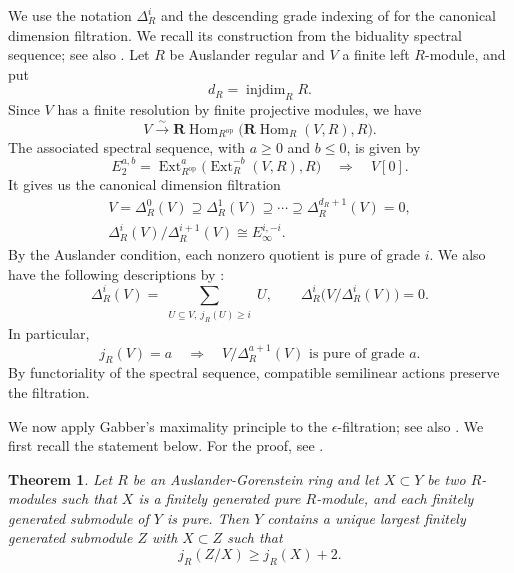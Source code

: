 \documentclass[11pt]{article}
\newtheorem{theorem}{Theorem}[section]
\theoremstyle{definition}
\begin{document}
We use the notation $\Delta_R^i$ and the descending grade indexing
of \cite[\S8]{ST03} for the canonical dimension filtration.
We recall its construction from the biduality spectral sequence;
see also \cite[\S3.1]{Venjakob2002}.
Let $R$ be Auslander regular and $V$ a finite left $R$-module, and put
\[
 d_R=\operatorname{injdim}_R R.
\]
Since $V$ has a finite resolution by finite projective modules, we have
\[
 V\xrightarrow{\sim}
 \mathbf R\!\operatorname{Hom}_{R^{\mathrm{op}}}
 \bigl(\mathbf R\!\operatorname{Hom}_R(V,R),R\bigr).
\]
The associated spectral sequence, with $a\geq0$ and $b\leq0$, is given by
\[
 E_2^{a,b}=
 \operatorname{Ext}_{R^{\mathrm{op}}}^{a}
 \bigl(\operatorname{Ext}_R^{-b}(V,R),R\bigr)
 \quad\Longrightarrow\quad
 V[0].
\]
It gives us the canonical dimension filtration
\[
 \begin{gathered}
 V=\Delta_R^0(V)\supseteq\Delta_R^1(V)\supseteq\cdots
   \supseteq\Delta_R^{d_R+1}(V)=0,\\
 \Delta_R^i(V)/\Delta_R^{i+1}(V)\cong E_\infty^{i,-i}.
 \end{gathered}
\]
By the Auslander condition, each nonzero quotient is pure of grade $i$.
We also have the following descriptions by
\cite[Propositions~3.5--3.6]{Venjakob2002}:
\[
 \Delta_R^i(V)=\sum_{\substack{U\subseteq V,\ j_R(U)\geq i}}U,
 \qquad \Delta_R^i\bigl(V/\Delta_R^i(V)\bigr)=0.
\]
In particular,
\[
 j_R(V)=a
 \quad\Rightarrow\quad
 V/\Delta_R^{a+1}(V)\text{ is pure of grade }a.
\]
By functoriality of the spectral sequence, compatible semilinear actions
preserve the filtration.

We now apply Gabber's maximality principle to the $\epsilon$-filtration; see also \cite[\S8.5]{ArdakovWadsley2013}.
We first recall the statement below. For the proof, see \cite[Theorem~1.14]{Bjork1989}.
\begin{theorem}%
      \label{thm:Gabber-max}
      Let $R$ be an Auslander-Gorenstein ring and let $X\subset Y$ be two $R$-modules such that $X$ is a finitely generated pure $R$-module, and each finitely generated submodule of $Y$ is pure. 
      Then $Y$ contains a unique largest finitely generated submodule $Z$ with $X\subset Z$ such that 
      \[j_{R}(Z/X)\ge j_R(X)+2. \] 
\end{theorem}
\end{document}
